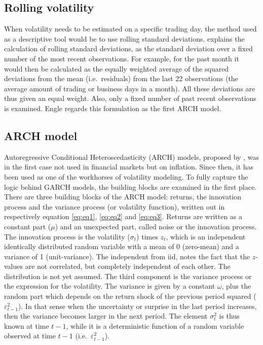 \documentclass[a4paper, twoside]{templates/ociamthesis}
\begin{document}
\hypertarget{rolling-volatility}{%
\subsection{Rolling volatility}\label{rolling-volatility}}

\noindent When volatility needs to be estimated on a specific trading day, the method used as a descriptive tool would be to use rolling standard deviations. \textcite{engle2001} explains the calculation of rolling standard deviations, as the standard deviation over a fixed number of the most recent observations. For example, for the past month it would then be calculated as the equally weighted average of the squared deviations from the mean (i.e.~residuals) from the last 22 observations (the average amount of trading or business days in a month). All these deviations are thus given an equal weight. Also, only a fixed number of past recent observations is examined. Engle regards this formulation as the first ARCH model.

\hypertarget{arch-model}{%
\subsection{ARCH model}\label{arch-model}}

\noindent Autoregressive Conditional Heteroscedasticity (ARCH) models, proposed by \textcite{engle1982}, was in the first case not used in financial markets but on inflation. Since then, it has been used as one of the workhorses of volatility modeling. To fully capture the logic behind GARCH models, the building blocks are examined in the first place. There are three building blocks of the ARCH model: returns, the innovation process and the variance process (or volatility function), written out in respectively equation \eqref{eq:eq1}, \eqref{eq:eq2} and \eqref{eq:eq3}. Returns are written as a constant part (\(\mu\)) and an unexpected part, called noise or the innovation process. The innovation process is the volatility (\(\sigma_t\)) times \(z_t\), which is an independent identically distributed random variable with a mean of 0 (zero-mean) and a variance of 1 (unit-variance). The independent from iid, notes the fact that the \(z\)-values are not correlated, but completely independent of each other. The distribution is not yet assumed. The third component is the variance process or the expression for the volatility. The variance is given by a constant \(\omega\), plus the random part which depends on the return shock of the previous period squared (\(\varepsilon_{t-1}^2\)). In that sense when the uncertainty or surprise in the last period increases, then the variance becomes larger in the next period. The element \(\sigma_t^2\) is thus known at time \(t-1\), while it is a deterministic function of a random variable observed at time \(t-1\) (i.e.~\(\varepsilon_{t-1}^2\)).
\end{document}

